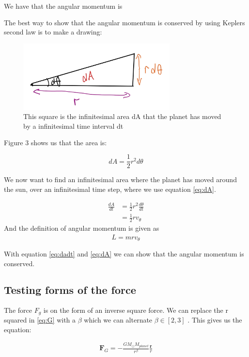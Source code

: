 \documentclass{article}
\begin{document}
We have that the angular momentum is 

The best way to show that the angular momentum is conserved by using Keplers second law is to make a drawing:

\begin{figure}[H]
	\centering
	\includegraphics[width=80mm]{sketch.jpg}
	\caption{This square is the infinitesimal area dA that the planet has moved by a infinitesimal time interval dt}
	\label{fig:1bplot}
\end{figure}

Figure 3 shows us that the area is:

\begin{equation}
    dA=\frac{1}{2}r^2d\theta
\label{eq:dA}
\end{equation}

We now want to find an infinitesimal area where the planet has moved around the sun, over an infinitesimal time step, where we use equation \ref{eq:dA}.

\begin{align}
    \frac{dA}{dt}&=\frac{1}2{r^2}\frac{d\theta}{dt}\\
    &=\frac{1}{2}rv_\theta
    \label{eq:dadt}
\end{align}
And the definition of angular momentum is given as
\begin{align*}
    L=mrv_\theta
\end{align*}

With equation \ref{eq:dadt} and \ref{eq:dA} we can show that the angular momentum is conserved.

\subsection{Testing forms of the force}

The force $F_g$ is on the form of an inverse square force. We can replace the r squared in \ref{eq:G} with a $\beta$ which we can alternate $\beta \in [2,3]$ . This gives us the equation:

\begin{align}
    \mathbf{F}_G=-\frac{GM_{\odot}M_{planet}}{r^{\beta}}\frac{\mathbf{r}}{r}
    \label{eq:F_b}
\end{align}
\end{document}
